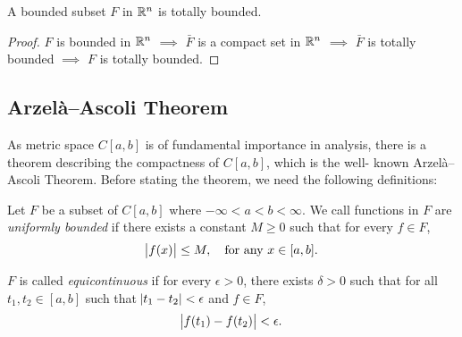 \begin{cor}
\label{cor:metric_spaces:compact_sets:totally_bounded_rn}
A bounded subset $F$ in $\mathbb{R}^n$ is totally bounded. 
\end{cor}
\begin{proof}
$F$ is bounded in $\mathbb{R}^n$ $\implies$ $\bar{F}$ is a compact set in $\mathbb{R}^n$ 
$\implies$ $\bar{F}$ is totally bounded $\implies$ $F$ is totally bounded. 
\end{proof}
\subsection{Arzelà–Ascoli Theorem}
As metric space $C[a, b]$ is of fundamental importance in analysis, there 
is a theorem describing the compactness of $C[a, b]$, which is the well-
known Arzelà–Ascoli Theorem. 
Before stating the theorem, we need the following definitions: 
\begin{defn}
Let $F$ be a subset of $C[a, b]$ where $-\infty < a < b < \infty$. 
We call functions in $F$ are \emph{uniformly bounded} if there exists a 
constant $M \ge 0$ such that for every $f \in F$, 
\begin{equation*}
    \abs{f(x)} \le M, \quad \text{for any } x \in [a, b].
\end{equation*}

$F$ is called \emph{equicontinuous} if for every $\epsilon > 0$, there 
exists $\delta > 0$ such that for all $t_1, t_2 \in [a, b]$ such that 
$\abs{t_1 - t_2} < \epsilon$ and $f \in F$, 
\begin{equation*}
    \abs{f(t_1) - f(t_2)} < \epsilon. 
\end{equation*}
\end{defn}

